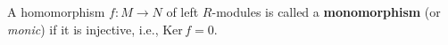 A homomorphism $f: M \to N$ of left $R$-modules is called a \textbf{monomorphism} (or \textit{monic}) if it is injective, i.e., $\text{Ker}\, f = 0$.
